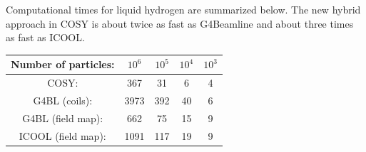 \documentclass[portrait,a0paper,fontscale=0.285]{baposter} %
\begin{document}
\begin{poster}
{Computational times for liquid hydrogen are summarized below. The new hybrid approach in COSY is about twice as fast as G4Beamline and about three times as fast as ICOOL.
\begin{center}
\begin{small}
\begin{tabularx}{\columnwidth}{ccccc}
\toprule
Number of particles: & $10^6$ & $10^5$ & $10^4$ & $10^3$\\
\midrule
COSY: & 367 & 31 & 6 & 4\\
G4BL (coils): & 3973 & 392 & 40 & 6\\
G4BL (field map): & 662 & 75 & 15 & 9\\
ICOOL (field map): & 1091 & 117 & 19 & 9\\
\bottomrule
\end{tabularx}
\end{small}
\end{center}
}

\end{poster}
\end{document}

